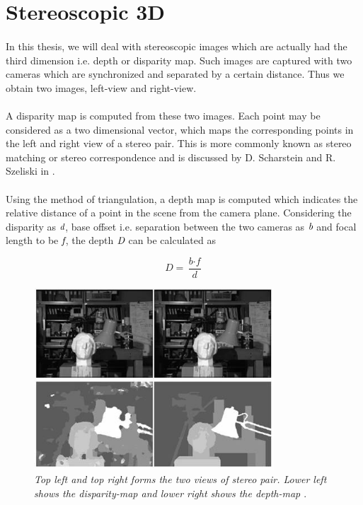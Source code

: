 \section{Stereoscopic 3D}
\paragraph{}
In this thesis, we will deal with stereoscopic images which are actually had the third dimension i.e. depth or disparity map. Such images are captured with two cameras which are synchronized and separated by a certain distance. Thus we obtain two images, left-view and right-view. 

\paragraph{}
A disparity map is computed from these two images. Each point may be considered as a two dimensional vector, which maps the corresponding points in the left and right view of a stereo pair. This is more commonly known as stereo matching or stereo correspondence and is discussed by D. Scharstein and R. Szeliski in \cite{bib:stereo_correspondence}.

\paragraph{}
Using the method of triangulation, a depth map is computed which indicates the relative distance of a point in the scene from the camera plane. Considering the disparity as $\emph{\textit{d}}$, base offset i.e. separation between the two cameras as $\emph{\textit{b}}$ and focal length to be $\emph{\textit{f}}$, the depth $\emph{D}$ can be calculated as

\begin{equation}
D = \frac{\textit{b} \cdot \textit{f}}{\textit{d}}
\end{equation}

\begin{figure}[ht]
\centerline{\includegraphics[width=0.8\textwidth]{stereo_disparity_depth.png}}
\caption{\textit{Top left and top right forms the two views of stereo pair. Lower left shows the disparity-map and lower right shows the depth-map \cite{bib:img_stereo_disparity_depth}} \label{fig:depth_disparity}.}
\end{figure}


